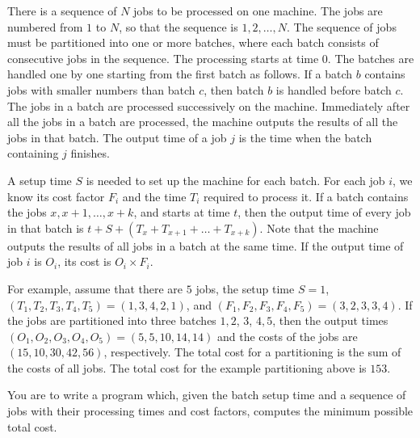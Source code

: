 There is a sequence of $N$ jobs to be processed on one machine.
The jobs are numbered from $1$ to $N$, so that the sequence is $1,2, \ldots, N$.
The sequence of jobs must be partitioned into one or more batches, where each batch consists of consecutive jobs in the sequence.
The processing starts at time $0$.
The batches are handled one by one starting from the first batch as follows.
If a batch $b$ contains jobs with smaller numbers than batch $c$, then batch $b$ is handled before batch $c$.
The jobs in a batch are processed successively on the machine.
Immediately after all the jobs in a batch are processed, the machine outputs the results of all the jobs in that batch.
The output time of a job $j$ is the time when the batch containing $j$ finishes.

A setup time $S$ is needed to set up the machine for each batch.
For each job $i$, we know its cost factor $F_i$ and the time $T_i$ required to process it.
If a batch contains the jobs $x, x+1, \ldots , x+k$, and starts at time $t$, then the output time of every job in that batch is $t + S + (T_x + T_{x+1} + \ldots + T_{x+k})$.
Note that the machine outputs the results of all jobs in a batch at the same time.
If the output time of job $i$ is $O_i$, its cost is $O_i \times F_i$.

For example, assume that there are $5$ jobs, the setup time $S = 1$, $(T_1, T_2, T_3, T_4, T_5) = (1, 3, 4, 2, 1)$, and $(F_1, F_2, F_3, F_4, F_5) = (3, 2, 3, 3, 4)$.
If the jobs are partitioned into three batches ${1, 2}$, ${3}$, ${4, 5}$, then the output times $(O_1, O_2, O_3, O_4, O_5) = (5, 5, 10, 14, 14)$ and the costs of the jobs are $(15, 10, 30, 42, 56)$, respectively.
The total cost for a partitioning is the sum of the costs of all jobs.
The total cost for the example partitioning above is $153$.

You are to write a program which, given the batch setup time and a sequence of jobs with their processing times and cost factors, computes the minimum possible total cost.